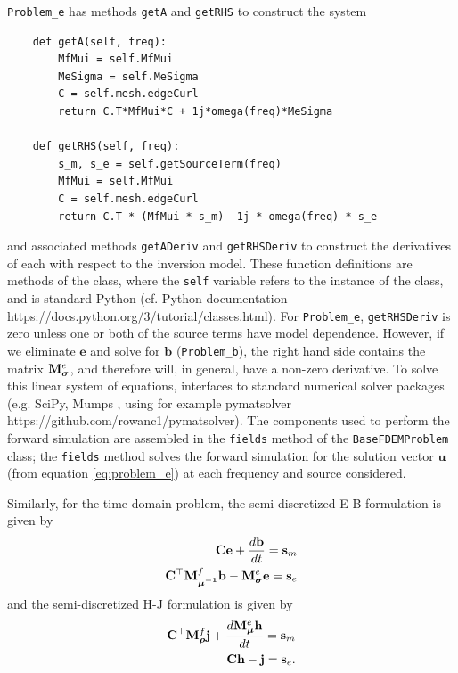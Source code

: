 \FDEM \texttt{Problem\_e} has methods \texttt{getA} and \texttt{getRHS} to construct the system
{\scriptsize
\begin{multicols}{2}
\begin{verbatim}
    def getA(self, freq):
        MfMui = self.MfMui
        MeSigma = self.MeSigma
        C = self.mesh.edgeCurl
        return C.T*MfMui*C + 1j*omega(freq)*MeSigma

    def getRHS(self, freq):
        s_m, s_e = self.getSourceTerm(freq)
        MfMui = self.MfMui
        C = self.mesh.edgeCurl
        return C.T * (MfMui * s_m) -1j * omega(freq) * s_e
\end{verbatim}
\end{multicols}
}
\noindent
and associated methods \texttt{getADeriv} and \texttt{getRHSDeriv} to
construct the derivatives of each with respect to the inversion model. These
function definitions are methods of the \Problem class, where the
\texttt{self} variable refers to the instance of the class, and is standard
Python (cf. Python documentation -
https://docs.python.org/3/tutorial/classes.html). For
\FDEM \texttt{Problem\_e}, \texttt{getRHSDeriv} is zero unless one or both of
the source terms have model dependence. However, if we eliminate $\mathbf{e}$ and solve for $\mathbf{b}$ (\texttt{Problem\_b}), the
right hand side contains the matrix ${{\mathbf M}^e_{\boldsymbol{\sigma}}}$, and therefore will, in
general, have a non-zero derivative. To solve this linear system of equations,
\SimPEG interfaces to standard numerical solver packages (e.g. SciPy, Mumps
\citep{scipy, Amestoy2001, Amestoy2006}, using for example pymatsolver
https://github.com/rowanc1/pymatsolver). The components used to perform the forward simulation
are assembled in the
\texttt{fields} method of the \texttt{BaseFDEMProblem} class; the \texttt{fields} method solves the forward simulation for the solution vector $\mathbf{u}$ (from equation
\ref{eq:problem_e}) at each frequency and source considered.

Similarly, for the time-domain problem, the semi-discretized E-B formulation is given by
\begin{equation}
    \begin{split}
        {\mathbf C} \mathbf{e} + \frac{d \mathbf{b}}{dt} = \mathbf{s}_m \\
        {\mathbf C}^\top {{\mathbf M}^f_{\boldsymbol{\mu^{-1}}}} \mathbf{b} - {{\mathbf M}^e_{\boldsymbol{\sigma}}} \mathbf{e} = \mathbf{s}_e
    \end{split}
    \label{eq:EB_TDEM}
\end{equation}
and the semi-discretized H-J formulation is given by
\begin{equation}
    \begin{split}
        {\mathbf C}^\top {{\mathbf M}^f_{\boldsymbol{\rho}}} \mathbf{j} + \frac{d {{\mathbf M}^e_{\boldsymbol{\mu}}}\mathbf{h}}{dt} = \mathbf{s}_m \\
        {\mathbf C} \mathbf{h} - \mathbf{j} = \mathbf{s}_e.
    \end{split}
    \label{eq:HJ_TDEM}
\end{equation}

